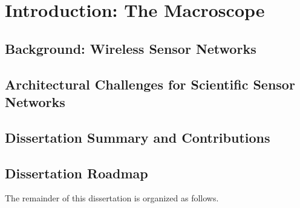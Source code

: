 \chapter{Introduction: The Macroscope} 
\label{chap-introduction}

\section{Background: Wireless Sensor Networks}

\section{Architectural Challenges for Scientific Sensor Networks}

\section{Dissertation Summary and Contributions}

\section{Dissertation Roadmap}

The remainder of this dissertation is organized as follows.


